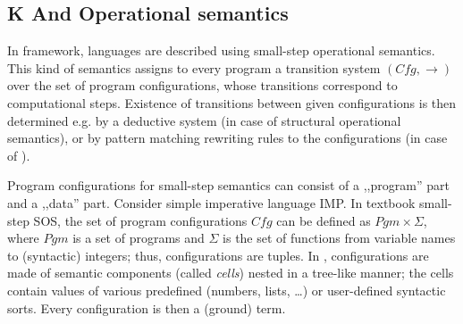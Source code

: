 \documentclass{fithesis3}
\newcommand{\var}[1]{\mathit{#1}}
\begin{document}


% 




\subsection{K And Operational semantics}





In \K framework, languages are described using small-step operational semantics. This kind of semantics assigns to every program a transition system $( \var{Cfg}, \rightarrow )$ over the set of program configurations, whose transitions correspond to computational steps. Existence of transitions between given configurations is then determined e.g. by a deductive system (in case of structural operational semantics), or by pattern matching rewriting rules to the configurations (in case of \K).



Program configurations for small-step semantics can consist of a ,,program'' part and a ,,data'' part. Consider simple imperative language IMP. In textbook small-step SOS, the set of program configurations $\var{Cfg}$ can be defined as $\var{Pgm} \times \Sigma$, where $\var{Pgm}$ is a set of programs and $\Sigma$ is the set of functions from variable names to (syntactic) integers; thus, configurations are tuples. In \K, configurations are made of semantic components (called \textit{cells}) nested in a tree-like manner; the cells contain values of various predefined (numbers, lists, \ldots) or user-defined syntactic sorts. Every configuration is then a (ground) term.
\end{document}
